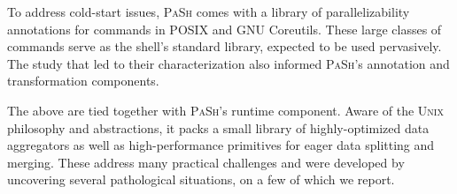\documentclass[sigplan, review, screen, anonymous]{acmart}
\newcommand{\ttt}[1]{\texttt{#1}}
\newcommand{\sys}{{\scshape PaSh}\xspace}
\newcommand{\unix}{{\scshape Unix}\xspace}
\begin{document}
To address cold-start issues, \sys comes with a library of parallelizability annotations for commands in POSIX and GNU Coreutils.
These large classes of commands serve as the shell's standard library, expected to be used pervasively. %
The study that led to their characterization also informed \sys's annotation and transformation components.

The above are tied together with \sys's runtime component.
Aware of the \unix philosophy and abstractions, it packs a small library of highly-optimized data aggregators as well as high-performance primitives for eager data splitting and merging.
These address many practical challenges %
  and were developed by uncovering several pathological situations, on a few of which we report.


\end{document}
